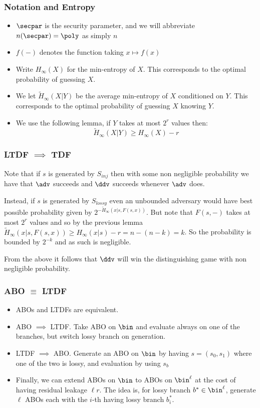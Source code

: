 \documentclass{beamer}
\begin{document}
\begin{frame}
    \frametitle{Notation and Entropy}
    \begin{itemize}
        \item $\secpar$ is the security parameter, and
              we will abbreviate $n(\secpar) = \poly$ as simply $n$
        \item $f({-})$ denotes the function taking $x \mapsto f(x)$
        \item Write $H_\infty(X)$ for the min-entropy of $X$. This corresponds to the optimal probability of guessing $X$.
        \item We let $\widetilde{H}_\infty(X|Y)$ be the average min-entropy of $X$ conditioned on $Y$.
              This corresponds to the optimal probability of guessing $X$ knowing $Y$.
        \item We use the following lemma, if $Y$ takes at most $2^r$ values then:
              \[ \widetilde{H}_\infty(X|Y) \geq H_\infty(X) - r \]
    \end{itemize}
\end{frame}

\begin{frame}
    \frametitle{LTDF $\implies$ TDF}
    Note that if $s$ is generated by $S_{inj}$ then with some non negligible probability
    we have that $\adv$ succeeds and $\ddv$ succeeds whenever $\adv$ does.

    Instead, if $s$ is generated by $S_{lossy}$ even an unbounded adversary
    would have best possible probability given by $2^{-\widetilde{H}_\infty(x|s, F(s, x))}$.
    But note that $F(s, {-})$ takes at most $2^r$ values and so by the previous
    lemma $\widetilde{H}_\infty(x|s, F(s, x)) \geq H_\infty(x|s) - r = n - (n - k) = k$.
    So the probability is bounded by $2^{-k}$ and as such is negligible.

    From the above it follows that $\ddv$ will win the distinguishing game with non negligible probability.

\end{frame}

\begin{frame}
    \frametitle{ABO $\equiv$ LTDF}
    \begin{itemize}
        \item ABOs and LTDFs are equivalent.
        \item ABO $\implies$ LTDF. Take ABO on $\bin$ and evaluate always on one of the branches, but switch lossy branch on generation.
        \item LTDF $\implies$ ABO. Generate an ABO on $\bin$ by having $s = (s_0, s_1)$ where one of the two is lossy, and evaluation by using $s_b$
        \item Finally, we can extend ABOs on $\bin$ to ABOs on $\bin^\ell$ at the cost of having residual leakage $\ell r$. The idea is,
              for lossy branch $b^* \in \bin^\ell$, generate $\ell$ ABOs each with the $i$-th having lossy branch $b^*_i$.
    \end{itemize}
\end{frame}
\end{document}

